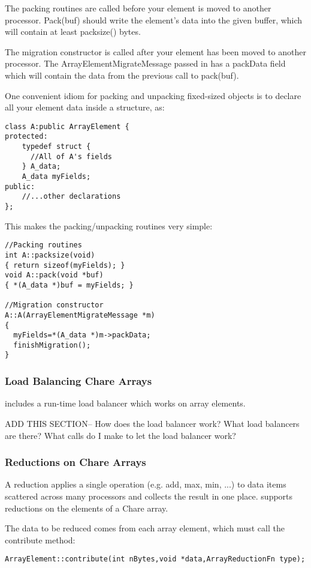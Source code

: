 The packing routines are called before your element is moved
to another processor.  Pack(buf) should write the element's
data into the given buffer, which will contain at least
packsize() bytes.

The migration constructor is called after your element has been
moved to another processor.  The ArrayElementMigrateMessage passed
in has a packData field which will contain the data from
the previous call to pack(buf).

One convenient idiom for packing and unpacking fixed-sized
objects is to declare all your element data inside a structure, 
as:

\begin{verbatim}
class A:public ArrayElement {
protected:
    typedef struct {
      //All of A's fields
    } A_data;
    A_data myFields;
public:
    //...other declarations
};
\end{verbatim}

This makes the packing/unpacking routines very simple:

\begin{verbatim}
//Packing routines
int A::packsize(void)
{ return sizeof(myFields); }
void A::pack(void *buf)
{ *(A_data *)buf = myFields; }

//Migration constructor
A::A(ArrayElementMigrateMessage *m)
{
  myFields=*(A_data *)m->packData;
  finishMigration();
}
\end{verbatim}

\subsubsection{Load Balancing Chare Arrays}
\charmpp includes a run-time load balancer which works
on array elements.  

\huge
ADD THIS SECTION-- How does the load balancer work?  What
load balancers are there?  What calls do I make to let the
load balancer work?
\normalsize


\subsubsection{Reductions on Chare Arrays}
A reduction applies a single operation (e.g. add, max, min, ...) to data items scattered across many processors and collects the result in one place.  \charmpp supports reductions on the elements of a Chare array.

The data to be reduced comes from each array element, which must call the contribute method:
\begin{verbatim}
ArrayElement::contribute(int nBytes,void *data,ArrayReductionFn type);
\end{verbatim}

